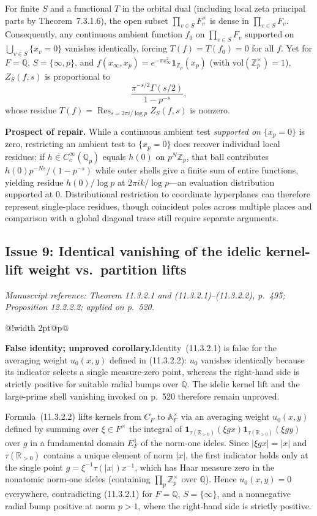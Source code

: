 \documentclass[11pt,letterpaper]{article}
\makeatletter
\newcommand{\msloc}[1]{%
  {\small\color{locgray}\itshape Manuscript reference: #1.}\par\nobreak\vspace{3pt}\@afterindentfalse\@afterheading
}
\newcommand{\issuefinding}[2]{%
  \begingroup
  \setlength{\fboxsep}{0pt}%
  \noindent\colorbox{barbg}{%
    \begin{tabular}{@{}!{\color{baraccent}\vrule width 2pt}@{\hspace{8pt}}p{\dimexpr\linewidth-18pt\relax}@{\hspace{8pt}}}
      \rule{0pt}{11.5pt}\small\textbf{\color{baraccent}#1}\enspace #2\rule[-4.5pt]{0pt}{0pt}
    \end{tabular}%
  }%
  \endgroup
  \par\nobreak\vspace{4.5pt}\@afterindentfalse\@afterheading
}
\newcommand{\Q}{\mathbb{Q}}
\newcommand{\R}{\mathbb{R}}
\newcommand{\Z}{\mathbb{Z}}
\newcommand{\A}{\mathbb{A}}
\DeclareMathOperator{\Res}{Res}
\makeatother
\begin{document}
For finite $S$ and a functional $T$ in the orbital dual (including local zeta principal parts by Theorem~7.3.1.6), the open subset $\prod_{v\in S} F_v^\times$ is dense in $\prod_{v\in S} F_v$. Consequently, any continuous ambient function $f_0$ on $\prod_{v\in S} F_v$ supported on $\bigcup_{v\in S}\{x_v=0\}$ vanishes identically, forcing $T(f)=T(f_0)=0$ for all $f$. Yet for $F=\Q$, $S=\{\infty,p\}$, and $f(x_\infty,x_p) = e^{-\pi x_\infty^2}\mathbf{1}_{\Z_p}(x_p)$ (with $\mathrm{vol}(\Z_p^\times)=1$), $Z_S(f,s)$ is proportional to
\[
  \frac{\pi^{-s/2}\Gamma(s/2)}{1 - p^{-s}},
\]
whose residue $T(f) = \Res_{s=2\pi i/\log p} Z_S(f,s)$ is nonzero.

\textbf{Prospect of repair.} While a continuous ambient test \emph{supported on} $\{x_p=0\}$ is zero, restricting an ambient test to $\{x_p=0\}$ does recover individual local residues: if $h\in C_c^\infty(\Q_p)$ equals $h(0)$ on $p^N\Z_p$, that ball contributes $h(0)p^{-Ns}/(1-p^{-s})$ while outer shells give a finite sum of entire functions, yielding residue $h(0)/\log p$ at $2\pi ik/\log p$---an evaluation distribution supported at $0$. Distributional restriction to coordinate hyperplanes can therefore represent single-place residues, though coincident poles across multiple places and comparison with a global diagonal trace still require separate arguments.

\subsection{Issue 9: Identical vanishing of the idelic kernel-lift weight vs.\ partition lifts}
\msloc{Theorem 11.3.2.1 and (11.3.2.1)--(11.3.2.2), p.~495; Proposition 12.2.2.2; applied on p.~520}
\issuefinding{False identity; unproved corollary.}{Identity~(11.3.2.1) is false for the averaging weight $u_0(x,y)$ defined in (11.3.2.2): $u_0$ vanishes identically because its indicator selects a single measure-zero point, whereas the right-hand side is strictly positive for suitable radial bumps over $\Q$. The idelic kernel lift and the large-prime shell vanishing invoked on p.~520 therefore remain unproved.}

Formula~(11.3.2.2) lifts kernels from $C_F$ to $\A_F^\times$ via an averaging weight $u_0(x,y)$ defined by summing over $\xi\in F^\times$ the integral of $\mathbf{1}_{\tau(\R_{>0})}(\xi g x)\mathbf{1}_{\tau(\R_{>0})}(\xi g y)$ over $g$ in a fundamental domain $E_F^1$ of the norm-one ideles. Since $|\xi g x|=|x|$ and $\tau(\R_{>0})$ contains a unique element of norm $|x|$, the first indicator holds only at the single point $g = \xi^{-1}\tau(|x|)x^{-1}$, which has Haar measure zero in the nonatomic norm-one ideles (containing $\prod_p\Z_p^\times$ over $\Q$). Hence $u_0(x,y)=0$ everywhere, contradicting (11.3.2.1) for $F=\Q$, $S=\{\infty\}$, and a nonnegative radial bump positive at norm $p>1$, where the right-hand side is strictly positive.
\end{document}
